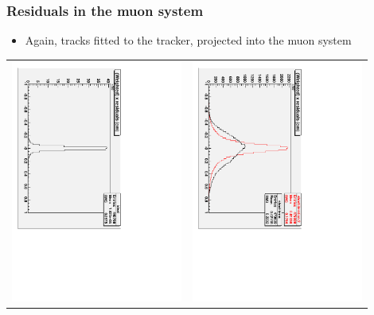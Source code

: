 \documentclass[compress]{beamer}
\begin{document}
\begin{frame}
\frametitle{Residuals in the muon system}

\begin{itemize}
\item Again, tracks fitted to the tracker, projected into the muon system
\end{itemize}

\begin{center}
\begin{tabular}{p{0.45\linewidth} p{0.45\linewidth}}
\begin{minipage}{\linewidth}
\includegraphics[height=\linewidth, angle=90]{deweight_outin_ideal.pdf}
\end{minipage} &
\begin{minipage}{\linewidth}
\includegraphics[height=\linewidth, angle=90]{deweight_outin_short.pdf}

\end{minipage}
\end{tabular}
\end{center}
\end{frame}
\end{document}
